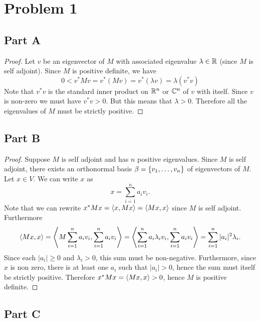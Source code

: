 \documentclass{article}
\begin{document}
\section*{Problem 1}
\subsection*{Part A}
\begin{proof}
    Let $v$ be an eigenvector of $M$ with associated eigenvalue $\lambda \in \mathbb{R}$ (since $M$ is self adjoint). Since $M$ is positive definite, we have
    \[
        0 < v^* M v = v^*(Mv) = v^* (\lambda v) = \lambda (v^* v)
    \]
    Note that $v^* v$ is the standard inner product on $\mathbb{R}^n$ or $\mathbb{C}^n$ of $v$ with itself. Since $v$ is non-zero we must have $v^* v > 0$. But this means that $\lambda > 0$. Therefore all the eigenvalues of $M$ must be strictly positive.
\end{proof}

\subsection*{Part B}
\begin{proof}
    Suppose $M$ is self adjoint and has $n$ positive eigenvalues. Since $M$ is self adjoint, there exists an orthonormal basis $\beta = \qty{v_1, \ldots, v_n}$ of eigenvectors of $M$. Let $x \in V$. We can write $x$ as
    \[
        x = \sum_{i=1}^n a_i v_i
    .\]
    Note that we can rewrite $x^* M x = \iprd{x, Mx} = \iprd{Mx, x}$ since $M$ is self adjoint. Furthermore
    \[
        \iprd{Mx,x} = \iprd{M \sum_{i=1}^n a_i v_i, \sum_{i=1}^n a_i v_i} = \iprd{\sum_{i=1}^n a_i \lambda_i v_i, \sum_{i=1}^n a_i v_i} = \sum_{i=1}^n |a_i|^2 \lambda_i
    .\]
    Since each $|a_i| \geq 0$ and $\lambda_i > 0$, this sum must be non-negative. Furthermore, since $x$ is non zero, there is at least one $a_i$ such that $|a_i| > 0$, hence the sum must itself be strictly positive. Therefore $x^* M x = \iprd{Mx, x} > 0$, hence $M$ is positive definite.
\end{proof}

\subsection*{Part C}

\end{document}
